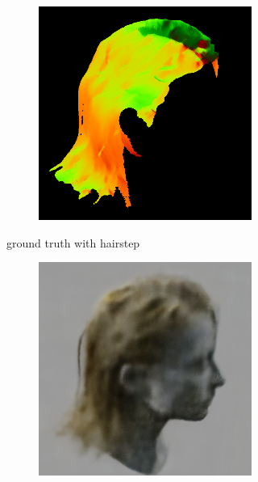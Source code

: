 \documentclass[12pt]{article}
\begin{document}
\begin{figure}[h]
\begin{subfigure}{0.48\textwidth}
\begin{subfigure}{0.48\textwidth}
            \includegraphics[width=\textwidth]{./images/test_6_hairstep.jpg}
        \end{subfigure}
        \caption{ground truth with hairstep}
    \end{subfigure}
    \hfill
    \begin{subfigure}{0.48\textwidth}
        \begin{subfigure}{0.48\textwidth}
            \centering
            \includegraphics[width=\textwidth]{./images/pred_6_nerf.png}

\end{subfigure}
\end{subfigure}
\end{figure}
\end{document}
